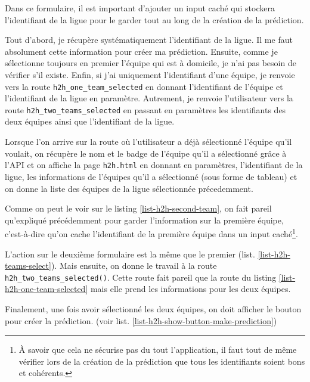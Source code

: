 \documentclass[a4paper,14pt]{extarticle}
\begin{document}
{

Dans ce formulaire, il est important d'ajouter un input caché qui stockera l'identifiant de la ligue pour le garder tout au long de la création de la prédiction.


Tout d'abord, je récupère systématiquement l'identifiant de la ligue. Il me faut absolument cette information pour créer ma prédiction. Ensuite, comme je sélectionne toujours en premier l'équipe qui est à domicile, je n'ai pas besoin de vérifier s'il existe. Enfin, si j'ai uniquement l'identifiant d'une équipe, je renvoie vers la route \texttt{h2h\_one\_team\_selected} en donnant l'identifiant de l'équipe et l'identifiant de la ligue en paramètre. Autrement, je renvoie l'utilisateur vers la route \texttt{h2h\_two\_teams\_selected} en passant en paramètres les identifiants des deux équipes ainsi que l'identifiant de la ligue.


Lorsque l'on arrive sur la route où l'utilisateur a déjà sélectionné l'équipe qu'il voulait, on récupère le nom et le badge de l'équipe qu'il a sélectionné grâce à l'API et on affiche la page \texttt{h2h.html} en donnant en paramètres, l'identifiant de la ligue, les informations de l'équipes qu'il a sélectionné (sous forme de tableau) et on donne la liste des équipes de la ligue sélectionnée précedemment.


Comme on peut le voir sur le listing \ref{list-h2h-second-team}, on fait pareil qu'expliqué précédemment pour garder l'information sur la première équipe, c'est-à-dire qu'on cache l'identifiant de la première équipe dans un input caché\footnote{À savoir que cela ne sécurise pas du tout l'application, il faut tout de même vérifier lors de la création de la prédiction que tous les identifiants soient bons et cohérents.}.

L'action sur le deuxième formulaire est la même que le premier (list. \ref{list-h2h-teams-select}). Mais ensuite, on donne le travail à la route \texttt{h2h\_two\_teams\_selected()}. Cette route fait pareil que la route du listing \ref{list-h2h-one-team-selected} mais elle prend les informations pour les deux équipes.


Finalement, une fois avoir sélectionné les deux équipes, on doit afficher le bouton pour créer la prédiction. (voir list. \ref{list-h2h-show-button-make-prediction})

}
\end{document}
